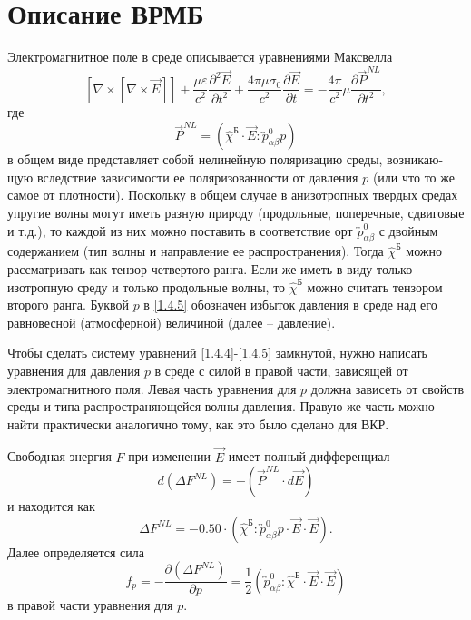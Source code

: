 \documentclass[a4paper]{article}
\begin{document}
\section{Описание ВРМБ}

Электромагнитное поле в среде описывается уравнениями Максвелла
\begin{equation}
	\left[\nabla\times\left[\nabla\times\vec{E}\right]\right]+\frac{\mu\varepsilon}{c^{2}}\frac{\partial^{2}\vec{E}}{\partial t^{2}}+\frac{4\pi\mu\sigma_{0}}{c^{2}}\frac{\partial\vec{E}}{\partial t}=-\frac{4\pi}{c^{2}}\mu\frac{\partial\vec{P}^{NL}}{\partial t^{2}},
	\label{1.4.4}
\end{equation}
где
\begin{equation}
	\vec{P}^{NL}=\left(\hat{\chi}^{\text{Б}}\cdot\vec{E}:\overleftrightarrow{p}^{0}_{\alpha\beta}p\right)\label{1.4.5}
\end{equation}
в общем виде представляет собой нелинейную поляризацию среды, возникаю-щую вследствие зависимости ее поляризованности от давления  $p$ (или что то же самое от плотности). Поскольку в общем случае в анизотропных твердых средах упругие волны могут иметь разную природу (продольные, поперечные, сдвиговые и т.д.), то каждой из них можно поставить в соответствие орт $\overleftrightarrow{p}^{0}_{\alpha\beta}$ с двойным содержанием (тип волны и направление ее распространения). Тогда  $\hat{\chi}^{\text{Б}}$  можно рассматривать как тензор четвертого ранга. Если же иметь в виду только изотропную среду и только продольные волны, то $\hat{\chi}^{\text{Б}}$ можно считать тензором второго ранга. Буквой  $p$  в \eqref{1.4.5} обозначен избыток давления в среде над его равновесной (атмосферной) величиной (далее – давление).

Чтобы сделать систему уравнений \eqref{1.4.4}-\eqref{1.4.5} замкнутой, нужно написать уравнения для давления $p$  в среде с силой в правой части, зависящей от электромагнитного поля. Левая часть уравнения для $p$  должна зависеть от свойств среды и типа распространяющейся волны давления. Правую же часть можно найти практически  аналогично тому, как это было сделано для ВКР. 

Свободная энергия $F$  при изменении $\vec{E}$  имеет полный дифференциал
\begin{equation}
	d(\Delta F^{NL})=-(\vec{P}^{NL}\cdot d\vec{E})
	\label{1.4.*}
	\tag{*}
\end{equation}
и находится как
\begin{equation}
	\Delta F^{NL}=-0.50\cdot(\hat{\chi}^{\text{Б}}:\overleftrightarrow{p}^{0}_{\alpha\beta}p\cdot\vec{E}\cdot\vec{E}).
	\tag{**}
	\label{1.4.**}
\end{equation}
Далее определяется сила
\begin{equation}
	f_{p}=-\frac{\partial(\Delta F^{NL})}{\partial p}=\frac{1}{2}(\overleftrightarrow{p}^{0}_{\alpha\beta}:\hat{\chi}^{\text{Б}}\cdot\vec{E}\cdot\vec{E})
	\label{1.4.6}
\end{equation}
в правой части уравнения для $p$. 
\end{document}
